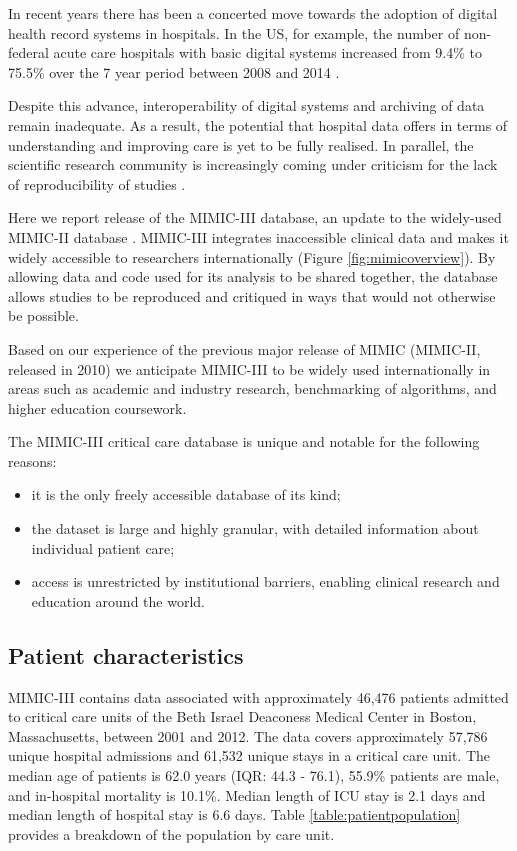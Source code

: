 \documentclass[english]{article}
\begin{document}
In recent years there has been a concerted move towards the adoption of digital health record systems in hospitals. In the US, for example, the number of non-federal acute care hospitals with basic digital systems increased from 9.4\% to 75.5\% over the 7 year period between 2008 and 2014 \cite{cite1}.

Despite this advance, interoperability of digital systems and archiving of data remain inadequate. As a result, the potential that hospital data offers in terms of understanding and improving care is yet to be fully realised. In parallel, the scientific research community is increasingly coming under criticism for the lack of reproducibility of studies \cite{cite2}.

Here we report release of the MIMIC-III database, an update to the widely-used MIMIC-II database \cite{cite3}. MIMIC-III integrates inaccessible clinical data and makes it widely accessible to researchers internationally (Figure \ref{fig:mimicoverview}). By allowing data and code used for its analysis to be shared together, the database allows studies to be reproduced and critiqued in ways that would not otherwise be possible. 

Based on our experience of the previous major release of MIMIC (MIMIC-II, released in 2010) we anticipate MIMIC-III to be widely used internationally in areas such as academic and industry research, benchmarking of algorithms, and higher education coursework.

The MIMIC-III critical care database is unique and notable for the following reasons: 
\begin{itemize}
  \item it is the only freely accessible database of its kind;
  \item the dataset is large and highly granular, with detailed information about individual patient care;
  \item access is unrestricted by institutional barriers, enabling clinical research and education around the world.
\end{itemize}

\subsection*{Patient characteristics}

MIMIC-III contains data associated with approximately 46,476 patients admitted to critical care units of the Beth Israel Deaconess Medical Center in Boston, Massachusetts, between 2001 and 2012. The data covers approximately 57,786 unique hospital admissions and 61,532 unique stays in a critical care unit. The median age of patients is 62.0 years (IQR: 44.3 - 76.1), 55.9\% patients are male, and in-hospital mortality is 10.1\%. Median length of ICU stay is 2.1 days and median length of hospital stay is 6.6 days. Table \ref{table:patientpopulation} provides a breakdown of the population by care unit.
\end{document}
